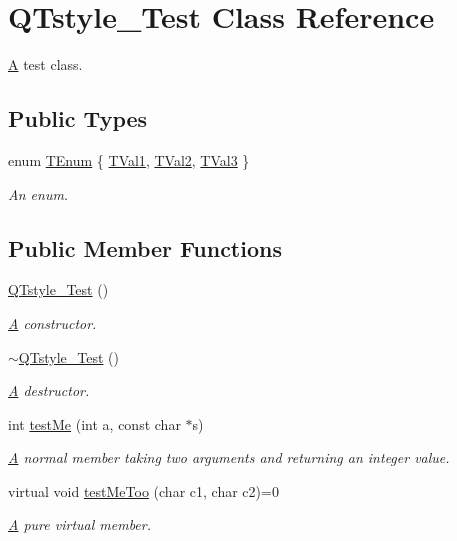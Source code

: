\hypertarget{class_q_tstyle___test}{}\section{Q\+Tstyle\+\_\+\+Test Class Reference}
\label{class_q_tstyle___test}


\hyperlink{class_a}{A} test class.  


\subsection*{Public Types}
\begin{DoxyCompactItemize}
\item 
enum \hyperlink{class_q_tstyle___test_a33e3643b66dfa91e4fb7cc663a23e166}{T\+Enum} \{ \hyperlink{class_q_tstyle___test_a33e3643b66dfa91e4fb7cc663a23e166ac9f4289a4feb75ac0139725819c1b157}{T\+Val1}, 
\hyperlink{class_q_tstyle___test_a33e3643b66dfa91e4fb7cc663a23e166ac00c479a45ce5e7084ad3f2afdfc2fb3}{T\+Val2}, 
\hyperlink{class_q_tstyle___test_a33e3643b66dfa91e4fb7cc663a23e166a0fdf008c61e518a16a3e9ec2cc8d2c78}{T\+Val3}
 \}\begin{DoxyCompactList}\small\item\em An enum. \end{DoxyCompactList}
\end{DoxyCompactItemize}
\subsection*{Public Member Functions}
\begin{DoxyCompactItemize}
\item 
\hyperlink{class_q_tstyle___test_ac3b85941ca31e9ad22f5bbe68b08a5d8}{Q\+Tstyle\+\_\+\+Test} ()
\begin{DoxyCompactList}\small\item\em \hyperlink{class_a}{A} constructor. \end{DoxyCompactList}\item 
\hyperlink{class_q_tstyle___test_a3a2c6d99c82a00c5e3224aca01f6c7c3}{$\sim$\+Q\+Tstyle\+\_\+\+Test} ()
\begin{DoxyCompactList}\small\item\em \hyperlink{class_a}{A} destructor. \end{DoxyCompactList}\item 
int \hyperlink{class_q_tstyle___test_af1299ea1b7efeb1548c7aba201ebe756}{test\+Me} (int a, const char $\ast$s)
\begin{DoxyCompactList}\small\item\em \hyperlink{class_a}{A} normal member taking two arguments and returning an integer value. \end{DoxyCompactList}\item 
virtual void \hyperlink{class_q_tstyle___test_afe4f857536cdccd2f160ad619a61eba3}{test\+Me\+Too} (char c1, char c2)=0
\begin{DoxyCompactList}\small\item\em \hyperlink{class_a}{A} pure virtual member. \end{DoxyCompactList}\end{DoxyCompactItemize}
